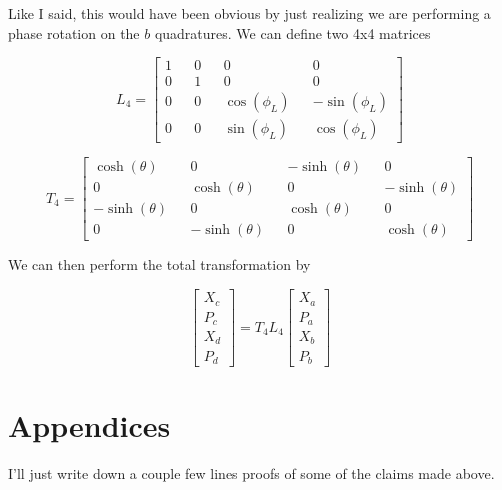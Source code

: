 \documentclass[12pt]{article}
\begin{document}
Like I said, this would have been obvious by just realizing we are performing a phase rotation on the $b$ quadratures. We can define two 4x4 matrices

\begin{equation}
L_4 = 
\begin{bmatrix}
1 && 0 && 0 && 0\\
0 && 1 && 0 && 0\\
0 && 0 && \cos(\phi_L) && -\sin(\phi_L)\\
0 && 0 && \sin(\phi_L) && \cos(\phi_L)
\end{bmatrix}
\end{equation}


\begin{equation}
T_4 =
\begin{bmatrix}
\cosh(\theta) && 0 && -\sinh(\theta) && 0\\
0 && \cosh(\theta) && 0 && -\sinh(\theta)\\
-\sinh(\theta) && 0 && \cosh(\theta) && 0\\
0 && -\sinh(\theta) && 0 && \cosh(\theta)
\end{bmatrix}
\end{equation}

We can then perform the total transformation by 

\begin{equation}
\begin{bmatrix}
X_c\\P_c\\X_d\\P_d
\end{bmatrix}
=
T_4 L_4
\begin{bmatrix}
X_a\\P_a\\X_b\\P_b
\end{bmatrix}
\end{equation}

\section{Appendices}
I'll just write down a couple few lines proofs of some of the claims made above.
\end{document}
